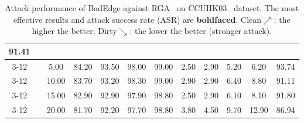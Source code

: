 \begin{table}[htbp]
{\begin{tabular}{cc|c|ccccccccc}
  91.41 \\ \cline{3-12} 
\multicolumn{1}{c|}{} &
   &
  5.00 &
  \multicolumn{1}{c|}{84.20} &
  \multicolumn{1}{c|}{93.50} &
  \multicolumn{1}{c|}{98.00} &
  \multicolumn{1}{c|}{99.00} &
  \multicolumn{1}{c|}{2.50} &
  \multicolumn{1}{c|}{2.90} &
  \multicolumn{1}{c|}{5.20} &
  \multicolumn{1}{c|}{6.20} &
  93.74 \\ \cline{3-12} 
\multicolumn{1}{c|}{} &
   &
  10.00 &
  \multicolumn{1}{c|}{83.70} &
  \multicolumn{1}{c|}{93.20} &
  \multicolumn{1}{c|}{98.30} &
  \multicolumn{1}{c|}{99.00} &
  \multicolumn{1}{c|}{2.90} &
  \multicolumn{1}{c|}{2.90} &
  \multicolumn{1}{c|}{6.40} &
  \multicolumn{1}{c|}{8.80} &
  91.11 \\ \cline{3-12} 
\multicolumn{1}{c|}{} &
   &
  15.00 &
  \multicolumn{1}{c|}{82.90} &
  \multicolumn{1}{c|}{92.90} &
  \multicolumn{1}{c|}{97.90} &
  \multicolumn{1}{c|}{98.80} &
  \multicolumn{1}{c|}{2.50} &
  \multicolumn{1}{c|}{2.90} &
  \multicolumn{1}{c|}{6.10} &
  \multicolumn{1}{c|}{8.10} &
  91.80 \\ \cline{3-12} 
\multicolumn{1}{c|}{} &
   &
  20.00 &
  \multicolumn{1}{c|}{81.70} &
  \multicolumn{1}{c|}{92.20} &
  \multicolumn{1}{c|}{97.70} &
  \multicolumn{1}{c|}{98.80} &
  \multicolumn{1}{c|}{3.80} &
  \multicolumn{1}{c|}{4.50} &
  \multicolumn{1}{c|}{9.70} &
  \multicolumn{1}{c|}{12.90} &
  86.94 \\ \hline
\end{tabular}
}
\caption{
Attack performance of BadEdge against RGA~\cite{sun2018beyond} on CCUHK03~\cite{zhang2017alignedreid}  dataset. The most effective results and attack success rate (ASR) are \textbf{boldfaced}. Clean$\nearrow$: the higher the better; Dirty$\searrow$: the lower the better (stronger attack).}
% 
\label{tab:RGA}
\vspace{-0.6cm}
\end{table}